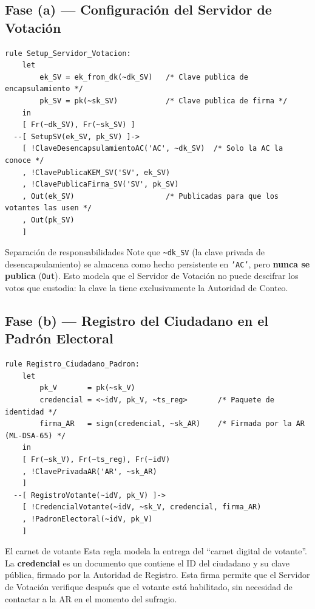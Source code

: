 \documentclass[12pt, a4paper]{article}
\begin{document}
\subsection{Fase (a) — Configuración del Servidor de Votación}

\begin{lstlisting}[caption={Regla: SV genera claves ML-KEM-768 y ML-DSA-65.}]
rule Setup_Servidor_Votacion:
    let
        ek_SV = ek_from_dk(~dk_SV)   /* Clave publica de encapsulamiento */
        pk_SV = pk(~sk_SV)           /* Clave publica de firma */
    in
    [ Fr(~dk_SV), Fr(~sk_SV) ]
  --[ SetupSV(ek_SV, pk_SV) ]->
    [ !ClaveDesencapsulamientoAC('AC', ~dk_SV)  /* Solo la AC la conoce */
    , !ClavePublicaKEM_SV('SV', ek_SV)
    , !ClavePublicaFirma_SV('SV', pk_SV)
    , Out(ek_SV)                     /* Publicadas para que los votantes las usen */
    , Out(pk_SV)
    ]
\end{lstlisting}

\begin{cajaConceto}{Separación de responsabilidades}
Note que \texttt{{\textasciitilde}dk\_SV} (la clave privada de desencapsulamiento)
se almacena como hecho persistente en \texttt{'AC'}, pero \textbf{nunca se
publica} (\texttt{Out}). Esto modela que el Servidor de Votación no puede
descifrar los votos que custodia: la clave la tiene exclusivamente la
Autoridad de Conteo.
\end{cajaConceto}

\subsection{Fase (b) — Registro del Ciudadano en el Padrón Electoral}

\begin{lstlisting}[caption={Regla: La AR registra al votante y emite su credencial firmada.}]
rule Registro_Ciudadano_Padron:
    let
        pk_V       = pk(~sk_V)
        credencial = <~idV, pk_V, ~ts_reg>       /* Paquete de identidad */
        firma_AR   = sign(credencial, ~sk_AR)    /* Firmada por la AR (ML-DSA-65) */
    in
    [ Fr(~sk_V), Fr(~ts_reg), Fr(~idV)
    , !ClavePrivadaAR('AR', ~sk_AR)
    ]
  --[ RegistroVotante(~idV, pk_V) ]->
    [ !CredencialVotante(~idV, ~sk_V, credencial, firma_AR)
    , !PadronElectoral(~idV, pk_V)
    ]
\end{lstlisting}

\begin{cajaAnalogía}{El carnet de votante}
Esta regla modela la entrega del ``carnet digital de votante''. La
\textbf{credencial} es un documento que contiene el ID del ciudadano y su
clave pública, firmado por la Autoridad de Registro. Esta firma permite que
el Servidor de Votación verifique después que el votante está habilitado,
sin necesidad de contactar a la AR en el momento del sufragio.
\end{cajaAnalogía}
\end{document}
